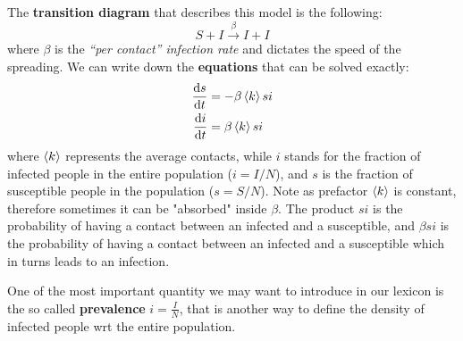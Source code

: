\documentclass[../main/main.tex]{subfiles}
\begin{document}
The \textbf{transition diagram} that describes this model is the following:
\begin{equation}
  S + I \overset{\beta }{\rightarrow} I + I
\end{equation}
where $\beta$ is the \textit{“per contact” infection rate} and dictates the speed of the spreading. We can write down the \textbf{equations} that can be solved exactly:
\begin{equation}
\begin{split}
  \dv{s}{t} &= - \beta \expval{k} s i \\ \dv{i}{t} &= \beta \expval{k} s i
\end{split}
\end{equation}
where $\expval{k}$ represents the average contacts, while $i$ stands for the fraction of infected people in the entire population ($i=I/N$), and $s$ is the fraction of susceptible people in the population ($s=S/N$). Note as prefactor $\expval{k}$ is constant, therefore sometimes it can be "absorbed" inside $\beta$. 
The product $s i$ is the probability of having a contact between an infected and a susceptible, and $\beta  s i$ is the probability of having a contact between an infected and a susceptible which in turns leads to an infection.

One of the most important quantity we may want to introduce in our lexicon is the so called \textbf{prevalence} $i = \frac{I}{N}$, that is another way to define the density of infected people wrt the entire population.
\end{document}

